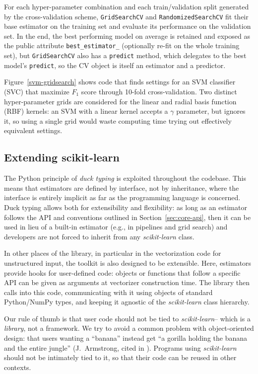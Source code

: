\documentclass[twocolumn]{article}
\newcommand{\sklearn}{\textit{scikit-learn}\xspace}
\begin{document}
For each hyper-parameter combination and each train/validation split
generated by the cross-validation scheme, \texttt{GridSearchCV}
and \texttt{RandomizedSearchCV} fit their base estimator on the training set and
evaluate its performance on the validation set.  In the end, the best performing
model on average is retained and exposed as the public attribute
\texttt{best\_estimator\_} (optionally re-fit on the whole training set),
but \texttt{GridSearchCV} also has a \texttt{predict} method,
which delegates to the best model's \texttt{predict},
so the CV object is itself an estimator and a predictor.

Figure~\ref{svm-gridsearch} shows code that finds
settings for an SVM classifier (SVC)
that maximize $F_1$ score
through 10-fold cross-validation.
Two distinct hyper-parameter grids are
considered for the linear and radial basis function (RBF) kernels:
an SVM with a linear kernel accepts a $\gamma$ parameter, but ignores it,
so using a single grid would waste computing time
trying out effectively equivalent settings.

\subsection{Extending scikit-learn}

The Python principle of \textit{duck typing} is exploited
throughout the codebase. This means that estimators are defined by interface,
not by inheritance, where the interface is entirely implicit
as far as the programming language is concerned.
Duck typing allows both for extensibility and
flexibility: as long as an estimator follows the API and conventions
outlined in Section~\ref{sec:core-api}, then it can be used in lieu of a
built-in estimator (e.g., in pipelines and grid search)
and developers are not forced to inherit from any \sklearn class.

In other places of the library, in particular in the vectorization code
for unstructured input, the toolkit is also designed to be
extensible. Here, estimators provide hooks for user-defined code: objects or
functions that follow a specific API can be given as arguments at vectorizer
construction time. The library then calls into this code,
communicating with it using objects of standard Python/NumPy types,
and keeping it agnostic of the \sklearn class hierarchy.

Our rule of thumb is that user code should not be tied to \sklearn -- which is a
\textit{library}, not a framework. We try to avoid a
common problem with object-oriented design: that users wanting a
``banana'' instead get ``a gorilla holding the banana and the entire jungle''
(J.~Armstrong, cited in \citep[p.~213]{seibel2009coders}).
Programs using \sklearn should not be intimately tied to it,
so that their code can be reused in other contexts.
\end{document}
